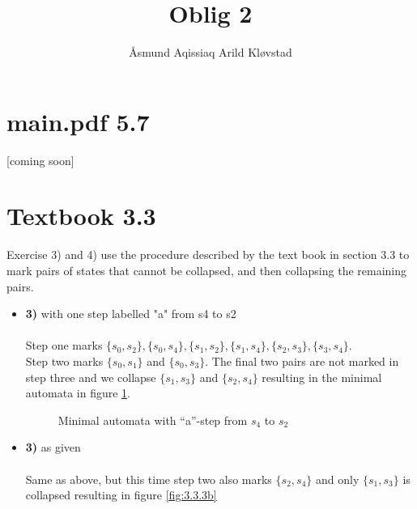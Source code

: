 \documentclass[defaultpackages]{simplereport}
\title{Oblig 2}
\author{Åsmund Aqissiaq Arild Kløvstad}
\begin{document}
\maketitle{}
\section*{main.pdf 5.7}
[coming soon]

\section*{Textbook 3.3}
  Exercise 3) and 4) use the procedure described by the text book in section 3.3
  to mark pairs of states that cannot be collapsed, and then collapsing the
  remaining pairs.
\begin{itemize}[label=]
\item \textbf{3)} with one step labelled "a" from s4 to s2\\\\
  Step one marks $\{s_0, s_2\}, \{s_0, s_4\}, \{s_1, s_2\}, \{s_1, s_4\}, \{s_2,
  s_3\}, \{s_3, s_4\}$.\\
  Step two marks $\{s_0, s_1\}$ and $\{s_0, s_3\}$. The final two pairs are not
  marked in step three and we collapse $\{s_1, s_3\}$ and $\{s_2, s_4\}$
  resulting in the minimal automata in figure \ref{fig:3.3.3a}.
  \begin{figure}[H]
     \centering
     \caption{Minimal automata with ``a''-step from $s_4$ to $s_2$}
     \label{fig:3.3.3a}
  \end{figure}
\item \textbf{3)} as given\\\\
  Same as above, but this time step two also marks $\{s_2, s_4\}$ and only
  $\{s_1, s_3\}$ is collapsed resulting in figure \ref{fig:3.3.3b}
  \begin{figure}[H]
     \centering
\end{figure}
\end{itemize}
\end{document}
